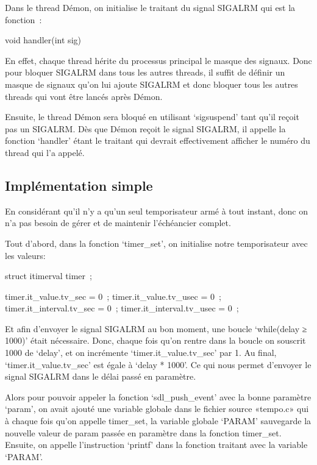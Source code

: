 \documentclass{article}
\begin{document}
Dans le thread Démon, on initialise le traitant du signal SIGALRM qui est la fonction :

void handler(int sig)

En effet, chaque thread hérite du processus principal le masque des signaux. Donc pour bloquer SIGALRM dans tous les autres threads, il suffit de définir un masque de signaux qu’on lui ajoute SIGALRM et donc bloquer tous les autres threads qui vont être lancés après Démon.

Ensuite, le thread Démon sera bloqué en utilisant ‘sigsuspend’ tant qu’il reçoit pas un SIGALRM.
Dès que Démon reçoit le signal SIGALRM, il appelle la fonction ‘handler’ étant le traitant qui devrait effectivement afficher le numéro du thread qui l’a appelé.

\subsection{Implémentation simple}

En considérant qu’il n’y a qu’un seul temporisateur armé à tout instant, donc on n’a pas besoin de gérer et de maintenir l’échéancier complet. 

Tout d’abord, dans la fonction ‘timer_set’, on initialise notre temporisateur avec les valeurs:

struct itimerval timer ;

timer.it_value.tv_sec = 0 ;
timer.it_value.tv_usec = 0 ;
timer.it_interval.tv_sec = 0 ;
timer.it_interval.tv_usec = 0 ;

Et afin d’envoyer le signal SIGALRM au bon moment, une boucle ‘while(delay ≥ 1000)’ était nécessaire. Donc, chaque fois qu’on rentre dans la boucle on souscrit 1000 de ‘delay’, et on incrémente  ‘timer.it_value.tv_sec’ par 1. Au final, ‘timer.it_value.tv_sec’ est égale à ‘delay * 1000’.
Ce qui nous permet d’envoyer le signal SIGALRM dans le délai passé en paramètre.

Alors pour pouvoir appeler la fonction ‘sdl_push_event’ avec la bonne paramètre ‘param’, on avait ajouté une variable globale dans le fichier source «tempo.c» qui à chaque fois qu’on appelle timer_set, la variable globale ‘PARAM’ sauvegarde la nouvelle valeur de param passée en paramètre dans la fonction timer_set. 
Ensuite, on appelle l’instruction ‘printf’ dans la fonction traitant avec la variable ‘PARAM’.
\end{document}
